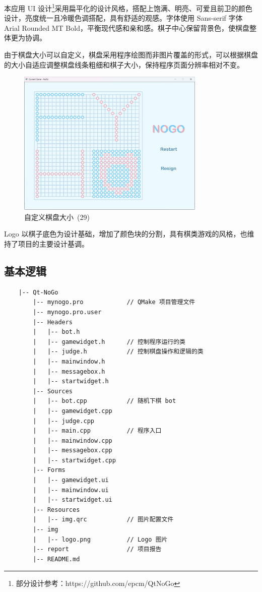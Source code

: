 \documentclass{noithesis}
\begin{document}
	本应用 UI 设计\footnote{部分设计参考：https://github.com/epcm/QtNoGo}采用扁平化的设计风格，搭配上饱满、明亮、可爱且前卫的颜色设计，亮度统一且冷暖色调搭配，具有舒适的观感。字体使用 Sans-serif 字体 Arial Rounded MT Bold，平衡现代感和亲和感。棋子中心保留背景色，使棋盘整体更为协调。
	
	由于棋盘大小可以自定义，棋盘采用程序绘图而非图片覆盖的形式，可以根据棋盘的大小自适应调整棋盘线条粗细和棋子大小，保持程序页面分辨率相对不变。
	
	\begin{figure}[!htb]{
			\centering
			\includegraphics[width=0.8\textwidth]{img/fyh.png}
			\caption{自定义棋盘大小~(29)}
		}
	\end{figure}
	
	Logo 以棋子底色为设计基础，增加了颜色块的分割，具有棋类游戏的风格，也维持了项目的主要设计基调。

	\subsection{基本逻辑}
	
	\begin{verbatim}
	|-- Qt-NoGo
	    |-- mynogo.pro            // QMake 项目管理文件
	    |-- mynogo.pro.user
	    |-- Headers
	    |   |-- bot.h
	    |   |-- gamewidget.h      // 控制程序运行的类
	    |   |-- judge.h           // 控制棋盘操作和逻辑的类
	    |   |-- mainwindow.h
	    |   |-- messagebox.h
	    |   |-- startwidget.h
	    |-- Sources
	    |   |-- bot.cpp           // 随机下棋 bot
	    |   |-- gamewidget.cpp
	    |   |-- judge.cpp
	    |   |-- main.cpp          // 程序入口
	    |   |-- mainwindow.cpp
	    |   |-- messagebox.cpp
	    |   |-- startwidget.cpp
	    |-- Forms
	    |   |-- gamewidget.ui
	    |   |-- mainwindow.ui
	    |   |-- startwidget.ui
	    |-- Resources
	    |   |-- img.qrc           // 图片配置文件
	    |-- img
	    |   |-- logo.png          // Logo 图片
	    |-- report                // 项目报告
	    |-- README.md
	\end{verbatim}
\end{document}
